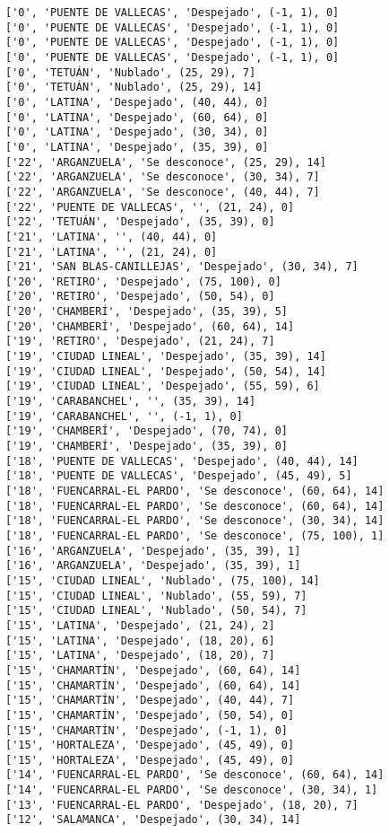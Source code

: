\documentclass[11pt]{article}
\begin{document}
\begin{Verbatim}[commandchars=\\\{\}]
['0', 'PUENTE DE VALLECAS', 'Despejado', (-1, 1), 0]
['0', 'PUENTE DE VALLECAS', 'Despejado', (-1, 1), 0]
['0', 'PUENTE DE VALLECAS', 'Despejado', (-1, 1), 0]
['0', 'PUENTE DE VALLECAS', 'Despejado', (-1, 1), 0]
['0', 'TETUÁN', 'Nublado', (25, 29), 7]
['0', 'TETUÁN', 'Nublado', (25, 29), 14]
['0', 'LATINA', 'Despejado', (40, 44), 0]
['0', 'LATINA', 'Despejado', (60, 64), 0]
['0', 'LATINA', 'Despejado', (30, 34), 0]
['0', 'LATINA', 'Despejado', (35, 39), 0]
['22', 'ARGANZUELA', 'Se desconoce', (25, 29), 14]
['22', 'ARGANZUELA', 'Se desconoce', (30, 34), 7]
['22', 'ARGANZUELA', 'Se desconoce', (40, 44), 7]
['22', 'PUENTE DE VALLECAS', '', (21, 24), 0]
['22', 'TETUÁN', 'Despejado', (35, 39), 0]
['21', 'LATINA', '', (40, 44), 0]
['21', 'LATINA', '', (21, 24), 0]
['21', 'SAN BLAS-CANILLEJAS', 'Despejado', (30, 34), 7]
['20', 'RETIRO', 'Despejado', (75, 100), 0]
['20', 'RETIRO', 'Despejado', (50, 54), 0]
['20', 'CHAMBERÍ', 'Despejado', (35, 39), 5]
['20', 'CHAMBERÍ', 'Despejado', (60, 64), 14]
['19', 'RETIRO', 'Despejado', (21, 24), 7]
['19', 'CIUDAD LINEAL', 'Despejado', (35, 39), 14]
['19', 'CIUDAD LINEAL', 'Despejado', (50, 54), 14]
['19', 'CIUDAD LINEAL', 'Despejado', (55, 59), 6]
['19', 'CARABANCHEL', '', (35, 39), 14]
['19', 'CARABANCHEL', '', (-1, 1), 0]
['19', 'CHAMBERÍ', 'Despejado', (70, 74), 0]
['19', 'CHAMBERÍ', 'Despejado', (35, 39), 0]
['18', 'PUENTE DE VALLECAS', 'Despejado', (40, 44), 14]
['18', 'PUENTE DE VALLECAS', 'Despejado', (45, 49), 5]
['18', 'FUENCARRAL-EL PARDO', 'Se desconoce', (60, 64), 14]
['18', 'FUENCARRAL-EL PARDO', 'Se desconoce', (60, 64), 14]
['18', 'FUENCARRAL-EL PARDO', 'Se desconoce', (30, 34), 14]
['18', 'FUENCARRAL-EL PARDO', 'Se desconoce', (75, 100), 1]
['16', 'ARGANZUELA', 'Despejado', (35, 39), 1]
['16', 'ARGANZUELA', 'Despejado', (35, 39), 1]
['15', 'CIUDAD LINEAL', 'Nublado', (75, 100), 14]
['15', 'CIUDAD LINEAL', 'Nublado', (55, 59), 7]
['15', 'CIUDAD LINEAL', 'Nublado', (50, 54), 7]
['15', 'LATINA', 'Despejado', (21, 24), 2]
['15', 'LATINA', 'Despejado', (18, 20), 6]
['15', 'LATINA', 'Despejado', (18, 20), 7]
['15', 'CHAMARTÍN', 'Despejado', (60, 64), 14]
['15', 'CHAMARTÍN', 'Despejado', (60, 64), 14]
['15', 'CHAMARTÍN', 'Despejado', (40, 44), 7]
['15', 'CHAMARTÍN', 'Despejado', (50, 54), 0]
['15', 'CHAMARTÍN', 'Despejado', (-1, 1), 0]
['15', 'HORTALEZA', 'Despejado', (45, 49), 0]
['15', 'HORTALEZA', 'Despejado', (45, 49), 0]
['14', 'FUENCARRAL-EL PARDO', 'Se desconoce', (60, 64), 14]
['14', 'FUENCARRAL-EL PARDO', 'Se desconoce', (30, 34), 1]
['13', 'FUENCARRAL-EL PARDO', 'Despejado', (18, 20), 7]
['12', 'SALAMANCA', 'Despejado', (30, 34), 14]

\end{Verbatim}
\end{document}
